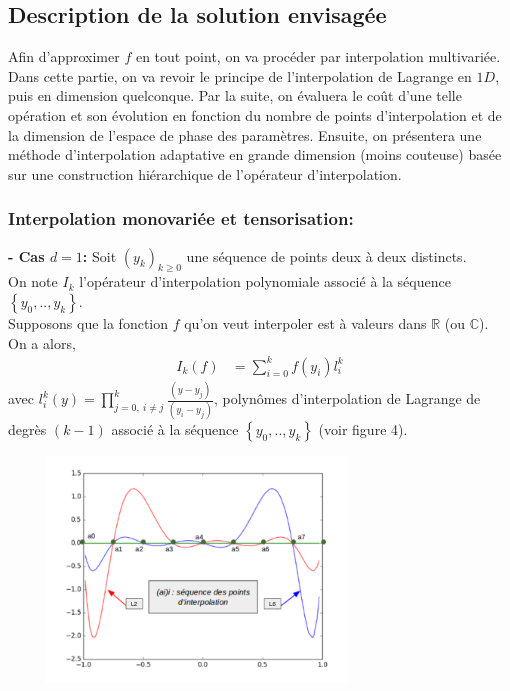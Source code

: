 \subsection{Description de la solution envisagée}\label{sec:4.1}
\hspace{0.5cm}
Afin d'approximer $f$ en tout point, on va procéder par interpolation multivariée. Dans cette partie, on va revoir le principe de
l'interpolation de Lagrange en $1D$, puis en dimension quelconque. Par la suite, on évaluera le coût d'une telle opération et son évolution en fonction
du nombre de points d'interpolation et de la dimension de l'espace de phase des paramètres.
Ensuite, on présentera une méthode d'interpolation adaptative en grande dimension (moins couteuse) basée sur une construction hiérarchique de l'opérateur d'interpolation. \\

\subsubsection{Interpolation monovariée et tensorisation:}\label{sec:4.1.1}
\hspace{0.5cm}
\textbf{ - Cas $d=1$: }
Soit $(y_k)_{k \geq 0}$ une séquence de points deux à deux distincts. \\
On note $I_k$ l'opérateur d'interpolation polynomiale associé à
la séquence $\left \{ y_0, .. , y_k \right \}$. \\
Supposons que la fonction $f$ qu'on veut interpoler est à valeurs dans $\mathbb{R}$ (ou $\mathbb{C}$).\\
\newpage
On a alors,
\begin{align}
   I_k(f) & = \sum_{i=0}^k f(y_i) l_i^k
\end{align}
avec $l_i^k(y) = \prod_{j=0,\ i \neq j}^k \frac{(y - y_j)}{(y_i - y_j)}$, polynômes d'interpolation de Lagrange
de degrès $(k-1)$ associé à la séquence $\left \{ y_0, .. , y_k \right \}$ (voir figure 4). \\
\begin{center}
\includegraphics[height=6cm,width=10cm]{images/lagrange_polynomials.png}
\end{center}

